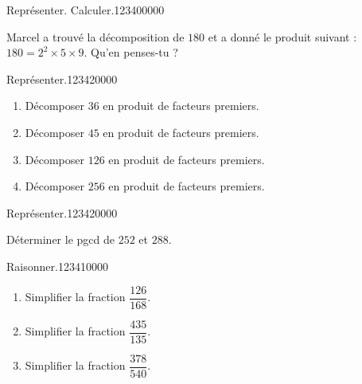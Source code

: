 \begin{pageParcoursu} 

\begin{ExoCu}{Représenter. Calculer.}{1234}{0}{0}{0}{0}{0}

Marcel a trouvé la décomposition de $180$ et a donné le produit suivant : $180 = 2^2 \times 5 \times 9$. Qu'en penses-tu ?  
\end{ExoCu}
 
\begin{ExoCu}{Représenter.}{1234}{2}{0}{0}{0}{0}
\begin{enumerate}
\item Décomposer $36$ en produit de facteurs premiers. 
\item Décomposer $45$ en produit de facteurs premiers. 
\item Décomposer $126$ en produit de facteurs premiers. 
\item Décomposer $256$ en produit de facteurs premiers. 
\end{enumerate}
\end{ExoCu}


\begin{ExoCu}{Représenter.}{1234}{2}{0}{0}{0}{0}

Déterminer le pgcd de $252$ et $288$.

\end{ExoCu}

 

\begin{ExoCu}{Raisonner.}{1234}{1}{0}{0}{0}{0}
\begin{enumerate}
\item Simplifier la fraction $\dfrac{126}{168}$. 
\item Simplifier la fraction $\dfrac{435}{135}$. 
\item Simplifier la fraction $\dfrac{378}{540}$. 
\end{enumerate}
\end{ExoCu}





\end{pageParcoursu} 
 
